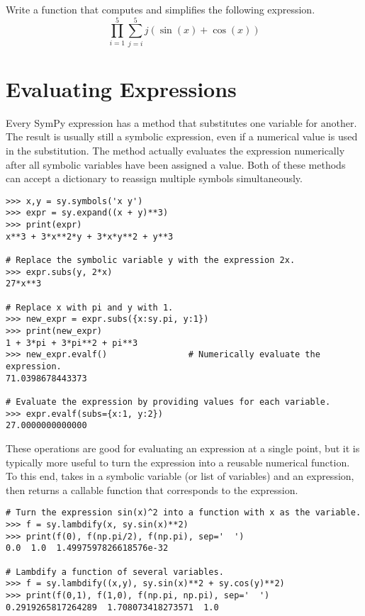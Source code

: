 \begin{problem}
Write a function that computes and simplifies the following expression.
\[\prod_{i=1}^{5} \sum_{j=i}^{5}j(\sin(x)+\cos(x))\]
\end{problem}

\section*{Evaluating Expressions} %

Every SymPy expression has a  method that substitutes one variable for another.
The result is usually still a symbolic expression, even if a numerical value is used in the substitution.
The  method actually evaluates the expression numerically after all symbolic variables have been assigned a value.
Both of these methods can accept a dictionary to reassign multiple symbols simultaneously.

\begin{lstlisting}
>>> x,y = sy.symbols('x y')
>>> expr = sy.expand((x + y)**3)
>>> print(expr)
x**3 + 3*x**2*y + 3*x*y**2 + y**3

# Replace the symbolic variable y with the expression 2x.
>>> expr.subs(y, 2*x)
27*x**3

# Replace x with pi and y with 1.
>>> new_expr = expr.subs({x:sy.pi, y:1})
>>> print(new_expr)
1 + 3*pi + 3*pi**2 + pi**3
>>> new_expr.evalf()                # Numerically evaluate the expression.
71.0398678443373

# Evaluate the expression by providing values for each variable.
>>> expr.evalf(subs={x:1, y:2})
27.0000000000000
\end{lstlisting}

These operations are good for evaluating an expression at a single point, but it is typically more useful to turn the expression into a reusable numerical function.
To this end,  takes in a symbolic variable (or list of variables) and an expression, then returns a callable function that corresponds to the expression.

\begin{lstlisting}
# Turn the expression sin(x)^2 into a function with x as the variable.
>>> f = sy.lambdify(x, sy.sin(x)**2)
>>> print(f(0), f(np.pi/2), f(np.pi), sep='  ')
0.0  1.0  1.4997597826618576e-32

# Lambdify a function of several variables.
>>> f = sy.lambdify((x,y), sy.sin(x)**2 + sy.cos(y)**2)
>>> print(f(0,1), f(1,0), f(np.pi, np.pi), sep='  ')
0.2919265817264289  1.708073418273571  1.0
\end{lstlisting}

